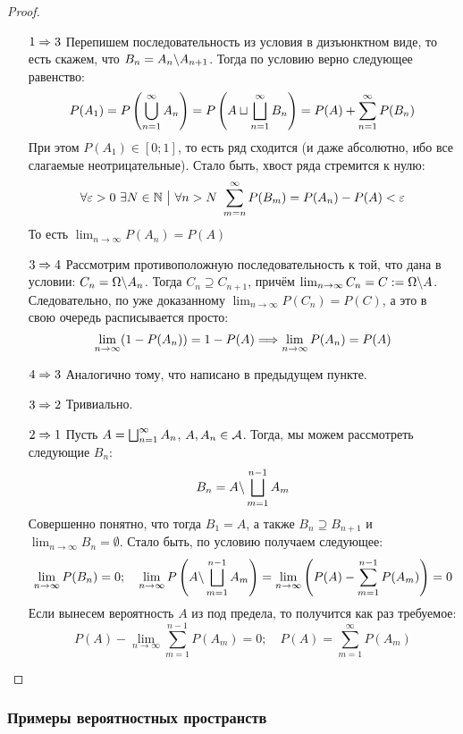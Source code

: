 \begin{proof}~
	\begin{itemize}
		\item[$1 \Rightarrow 3$] Перепишем последовательность из условия в дизъюнктном виде, то есть скажем, что $B_n = A_n \backslash A_{n + 1}$. Тогда по условию верно следующее равенство:
		\[
			P(A_1) = P\left(\bigcup_{n = 1}^\infty A_n\right) = P\left(A \sqcup \bigsqcup_{n = 1}^\infty B_n\right) = P(A) + \sum_{n = 1}^\infty P(B_n)
		\]
		При этом $P(A_1) \in [0; 1]$, то есть ряд сходится (и даже абсолютно, ибо все слагаемые неотрицательные). Стало быть, хвост ряда стремится к нулю:
		\[
			\forall \varepsilon > 0\ \exists N \in \mathbb{N} \ \big|\  \forall n > N\ \sum_{m = n}^\infty P(B_m) = P(A_n) - P(A) < \varepsilon
		\]
		То есть $\lim_{n \to \infty} P(A_n) = P(A)$
		
		\item[$3 \Rightarrow 4$] Рассмотрим противоположную последовательность к той, что дана в условии: $C_n = \Omega \backslash A_n$. Тогда $C_n \supseteq C_{n + 1}$, причём $\lim_{n \to \infty} C_n = C := \Omega \backslash A$. Следовательно, по уже доказанному $\lim_{n \to \infty} P(C_n) = P(C)$, а это в свою очередь расписывается просто:
		\[
			\lim_{n \to \infty} (1 - P(A_n)) = 1 - P(A) \Longrightarrow \lim_{n \to \infty} P(A_n) = P(A)
		\]
		
		\item[$4 \Rightarrow 3$] Аналогично тому, что написано в предыдущем пункте.
		
		\item[$3 \Rightarrow 2$] Тривиально.
		
		\item[$2 \Rightarrow 1$] Пусть $A = \bigsqcup_{n = 1}^\infty A_n$, $A, A_n \in \mathcal{A}$. Тогда, мы можем рассмотреть следующие $B_n$:
		\[
			B_n = A \backslash \bigsqcup_{m = 1}^{n - 1} A_m
		\]
		Совершенно понятно, что тогда $B_1 = A$, а также $B_n \supseteq B_{n + 1}$ и $\lim_{n \to \infty} B_n = \emptyset$. Стало быть, по условию получаем следующее:
		\[
			\lim_{n \to \infty} P(B_n) = 0; \quad \lim_{n \to \infty} P\left(A \backslash \bigsqcup_{m = 1}^{n - 1} A_m\right) = \lim_{n \to \infty} \left(P(A) - \sum_{m = 1}^{n - 1} P(A_m)\right) = 0
		\]
		Если вынесем вероятность $A$ из под предела, то получится как раз требуемое:
		\[
			P(A) - \lim_{n \to \infty} \sum_{m = 1}^{n - 1} P(A_m) = 0; \quad P(A) = \sum_{m = 1}^\infty P(A_m)
		\]
	\end{itemize}
\end{proof}

\subsubsection*{Примеры вероятностных пространств}

